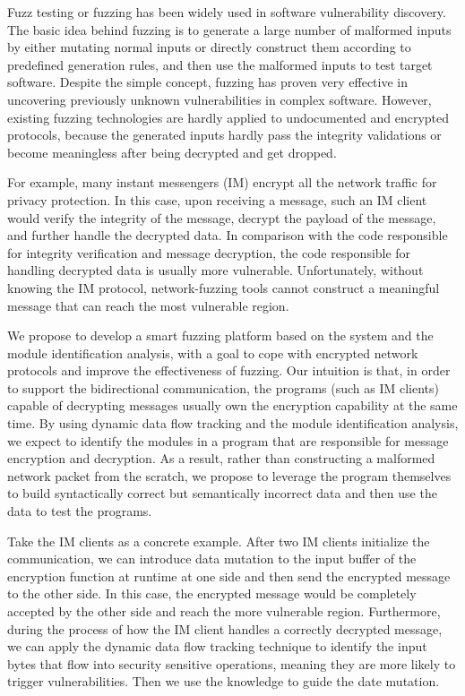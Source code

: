 Fuzz testing or fuzzing has been widely used in software vulnerability
discovery. The basic idea behind fuzzing is to generate a large number
of malformed inputs by either mutating normal inputs or directly
construct them according to predefined generation rules, and then use
the malformed inputs to test target software. Despite the simple
concept, fuzzing has proven very effective in uncovering previously
unknown vulnerabilities in complex software. However, existing fuzzing
technologies are hardly applied to undocumented and encrypted protocols,
because the generated inputs hardly pass the integrity validations or
become meaningless after being decrypted and get dropped.
 
For example, many instant messengers (IM) encrypt all the network
traffic for privacy protection. In this case, upon receiving a message,
such an IM client would verify the integrity of the message, decrypt the
payload of the message, and further handle the decrypted data.  In
comparison with the code responsible for integrity verification and
message decryption, the code responsible for handling decrypted data is
usually more vulnerable. Unfortunately, without knowing the IM protocol,
network-fuzzing tools cannot construct a meaningful message that can
reach the most vulnerable region.
 
We propose to develop a smart fuzzing platform based on the
\dynamicsys system and the module identification analysis, with a goal
to cope with encrypted network protocols and improve the effectiveness
of fuzzing.  Our intuition is that, in order to support the
bidirectional communication, the programs (such as IM clients) capable
of decrypting messages usually own the encryption capability at the same
time.  By using dynamic data flow tracking and the module identification
analysis, we expect to identify the modules in a program that are
responsible for message encryption and decryption. As a result, rather
than constructing a malformed network packet from the scratch, we
propose to leverage the program themselves to build syntactically
correct but semantically incorrect data and then use the data to test
the programs.  
 
Take the IM clients as a concrete example.  After two IM clients
initialize the communication, we can introduce data mutation to the
input buffer of the encryption function at runtime at one side and then
send the encrypted message to the other side. In this case, the
encrypted message would be completely accepted by the other side and
reach the more vulnerable region.  Furthermore, during the process of
how the IM client handles a correctly decrypted message, we can apply
the dynamic data flow tracking technique to identify the input bytes
that flow into security sensitive operations, meaning they are more
likely to trigger vulnerabilities.  Then we use the knowledge to guide
the date mutation.

